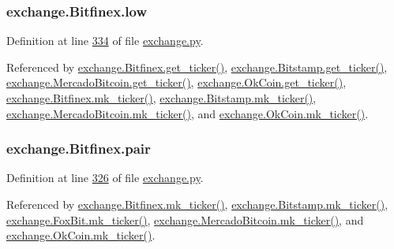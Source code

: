 \subsubsection[{\texorpdfstring{low}{low}}]{\setlength{\rightskip}{0pt plus 5cm}exchange.\+Bitfinex.\+low}\hypertarget{classexchange_1_1_bitfinex_a7d4241119b1fa3860743647a0c6c3416}{}\label{classexchange_1_1_bitfinex_a7d4241119b1fa3860743647a0c6c3416}


Definition at line \hyperlink{exchange_8py_source_l00334}{334} of file \hyperlink{exchange_8py_source}{exchange.\+py}.



Referenced by \hyperlink{exchange_8py_source_l00340}{exchange.\+Bitfinex.\+get\+\_\+ticker()}, \hyperlink{exchange_8py_source_l00409}{exchange.\+Bitstamp.\+get\+\_\+ticker()}, \hyperlink{exchange_8py_source_l00543}{exchange.\+Mercado\+Bitcoin.\+get\+\_\+ticker()}, \hyperlink{exchange_8py_source_l00608}{exchange.\+Ok\+Coin.\+get\+\_\+ticker()}, \hyperlink{exchange_8py_source_l00354}{exchange.\+Bitfinex.\+mk\+\_\+ticker()}, \hyperlink{exchange_8py_source_l00423}{exchange.\+Bitstamp.\+mk\+\_\+ticker()}, \hyperlink{exchange_8py_source_l00557}{exchange.\+Mercado\+Bitcoin.\+mk\+\_\+ticker()}, and \hyperlink{exchange_8py_source_l00622}{exchange.\+Ok\+Coin.\+mk\+\_\+ticker()}.

\subsubsection[{\texorpdfstring{pair}{pair}}]{\setlength{\rightskip}{0pt plus 5cm}exchange.\+Bitfinex.\+pair}\hypertarget{classexchange_1_1_bitfinex_a901a5499667f1f2b391bc9dbbfe1c1c7}{}\label{classexchange_1_1_bitfinex_a901a5499667f1f2b391bc9dbbfe1c1c7}


Definition at line \hyperlink{exchange_8py_source_l00326}{326} of file \hyperlink{exchange_8py_source}{exchange.\+py}.



Referenced by \hyperlink{exchange_8py_source_l00354}{exchange.\+Bitfinex.\+mk\+\_\+ticker()}, \hyperlink{exchange_8py_source_l00423}{exchange.\+Bitstamp.\+mk\+\_\+ticker()}, \hyperlink{exchange_8py_source_l00482}{exchange.\+Fox\+Bit.\+mk\+\_\+ticker()}, \hyperlink{exchange_8py_source_l00557}{exchange.\+Mercado\+Bitcoin.\+mk\+\_\+ticker()}, and \hyperlink{exchange_8py_source_l00622}{exchange.\+Ok\+Coin.\+mk\+\_\+ticker()}.

